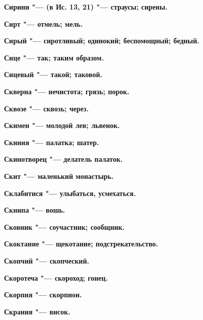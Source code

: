 \begin{multicols}{2}
\bfseries Сирини\normalfont{} "--- (в Ис. 13, 21) "--- страусы; сирены. 




\bfseries Сирт\normalfont{} "--- отмель; мель. 




\bfseries Сирый\normalfont{} "--- сиротливый; одинокий; беспомощный; бедный. 




\bfseries Сице\normalfont{} "--- так; таким образом. 




\bfseries Сицевый\normalfont{} "--- такой; таковой. 




\bfseries Скверна\normalfont{} "--- нечистота; грязь; порок. 




\bfseries Сквозе\normalfont{} "--- сквозь; через. 




\bfseries Скимен\normalfont{} "--- молодой лев; львенок. 




\bfseries Скиния\normalfont{} "--- палатка; шатер. 




\bfseries Скинотворец\normalfont{} "--- делатель палаток. 




\bfseries Скит\normalfont{} "--- маленький монастырь. 




\bfseries Склабитися\normalfont{} "--- улыбаться, усмехаться. 




\bfseries Скнипа\normalfont{} "--- вошь. 




\bfseries Сковник\normalfont{} "--- соучастник; сообщник. 




\bfseries Скоктание\normalfont{} "--- щекотание; подстрекательство. 




\bfseries Скопчий\normalfont{} "--- скопческий. 




\bfseries Скоротеча\normalfont{} "--- скороход; гонец. 




\bfseries Скорпия\normalfont{} "--- скорпион. 




\bfseries Скрания\normalfont{} "--- висок. 





\end{multicols}
